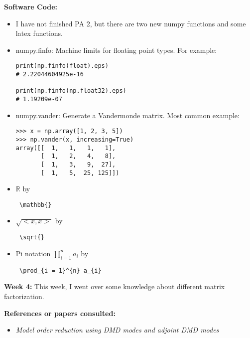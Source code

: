 \documentclass{article}
\begin{document}
\textbf{Software Code:}
\begin{itemize}
\item I have not finished PA 2, but there are two new numpy functions and some latex functions.
\item numpy.finfo: Machine limits for floating point types. For example:
\begin{verbatim}
print(np.finfo(float).eps)
# 2.22044604925e-16

print(np.finfo(np.float32).eps)
# 1.19209e-07    
\end{verbatim}

\item numpy.vander: Generate a Vandermonde matrix. Most common example:
\begin{verbatim}
>>> x = np.array([1, 2, 3, 5])
>>> np.vander(x, increasing=True)
array([[  1,   1,   1,   1],
       [  1,   2,   4,   8],
       [  1,   3,   9,  27],
       [  1,   5,  25, 125]])    
\end{verbatim}
\item $\mathbb{R}$ by  \begin{verbatim} \mathbb{}  \end{verbatim} 
\item $\sqrt{<x,x>} $  by \begin{verbatim} \sqrt{} \end{verbatim} 
\item Pi notation $\prod_{i = 1}^{n} a_{i}$ by \begin{verbatim} \prod_{i = 1}^{n} a_{i} \end{verbatim}
\end{itemize}



\newpage
\textbf{Week 4:}
This week, I went over some knowledge about different matrix factorization.

\textbf{References or papers consulted:}
\begin{itemize}

\item {\em Model order reduction using DMD modes and adjoint DMD modes}

\end{itemize}
\end{document}

